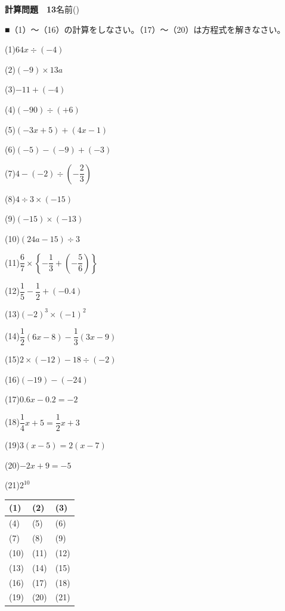 \documentclass[a4paper,11pt]{ltjsarticle}
\newlength{\qcol}\setlength{\qcol}{0.47\textwidth}
\newlength{\qgap}
\newlength{\anscolw}\setlength{\anscolw}{0.30\textwidth}
\newlength{\ansh}
\newcommand{\Q}[2]{\parbox[t]{\qcol}{\raggedright (#1)\hspace{0.6em}$\displaystyle #2$}}
\newcommand{\QR}[4]{\Q{#1}{#2}\hfill\Q{#3}{#4}\par\vspace{\qgap}}
\newcommand{\anscell}[1]{\rule[-\ansdrop]{0pt}{\ansh}(#1)}
\newlength{\ansdrop}
\begin{document}
{\large\bfseries 計算問題　13}\hfill 名前(\underline{\hspace{32mm}})\par\vspace{3mm}
■（1）〜（16）の計算をしなさい。（17）〜（20）は方程式を解きなさい。\par\vspace{3mm}
\setlength{\qgap}{5.4mm}
\QR{1}{64x\div(-4)}{2}{(-9)\times13a}
\QR{3}{-11+(-4)}{4}{(-90)\div(+6)}
\QR{5}{(-3x+5)+(4x-1)}{6}{(-5)-(-9)+(-3)}
\QR{7}{4-(-2)\div\left(-\dfrac{2}{3}\right)}{8}{4\div3\times(-15)}
\QR{9}{(-15)\times(-13)}{10}{(24a-15)\div3}
\QR{11}{\dfrac{6}{7}\times\left\{-\dfrac{1}{3}+\left(-\dfrac{5}{6}\right)\right\}}{12}{\dfrac{1}{5}-\dfrac{1}{2}+(-0.4)}
\QR{13}{(-2)^3\times(-1)^2}{14}{\dfrac{1}{2}(6x-8)-\dfrac{1}{3}(3x-9)}
\QR{15}{2\times(-12)-18\div(-2)}{16}{(-19)-(-24)}
\QR{17}{0.6x-0.2=-2}{18}{\dfrac{1}{4}x+5=\dfrac{1}{2}x+3}
\QR{19}{3(x-5)=2(x-7)}{20}{-2x+9=-5}
\vspace{1mm}
\Q{21}{2^{10}}\par\vspace{3mm}
\setlength{\ansh}{9.5mm}\setlength{\ansdrop}{6mm}%
\begin{center}\begin{tabular}{|p{\anscolw}|p{\anscolw}|p{\anscolw}|}\hline
\anscell{1} & \anscell{2} & \anscell{3} \\\hline
\anscell{4} & \anscell{5} & \anscell{6} \\\hline
\anscell{7} & \anscell{8} & \anscell{9} \\\hline
\anscell{10} & \anscell{11} & \anscell{12} \\\hline
\anscell{13} & \anscell{14} & \anscell{15} \\\hline
\anscell{16} & \anscell{17} & \anscell{18} \\\hline
\anscell{19} & \anscell{20} & \anscell{21} \\\hline
\end{tabular}\end{center}
\end{document}
